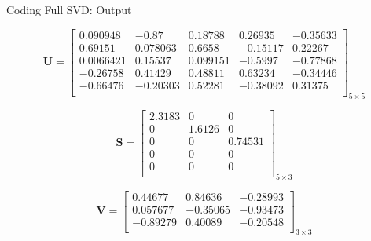 \documentclass[9pt]{beamer}
\begin{document}
\begin{frame}{Coding Full SVD: Output}
    
    \begin{displaymath}
    \mathbf{U} = 
        \begin{bmatrix}
            0.090948 &	-0.87&	0.18788	&0.26935&	-0.35633\\
            0.69151	&0.078063&	0.6658&	-0.15117&	0.22267\\
            0.0066421&	0.15537	&0.099151&	-0.5997&	-0.77868\\
            -0.26758&	0.41429&	0.48811&	0.63234&	-0.34446\\
            -0.66476&	-0.20303&	0.52281&	-0.38092&	0.31375\\
        \end{bmatrix}_{5 \times 5}
    \end{displaymath}
    
        \begin{displaymath}
    \mathbf{S} = 
        \begin{bmatrix}
            2.3183&	0&	0\\
            0&	1.6126&	0\\
            0	&0	&0.74531\\
            0&	0&	0\\
            0&	0&	0\\
        \end{bmatrix}_{5 \times 3}
    \end{displaymath}
    
    \begin{displaymath}
    \mathbf{V} = 
        \begin{bmatrix}
            0.44677&	0.84636&	-0.28993\\
            0.057677&	-0.35065&	-0.93473\\
            -0.89279&	0.40089&	-0.20548\\
        \end{bmatrix}_{3 \times 3}
    \end{displaymath}
\end{frame}
\end{document}
